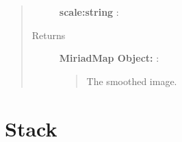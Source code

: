 \documentclass[a4paper,10pt,english]{sphinxmanual}
\begin{document}
\begin{fulllineitems}
\begin{fulllineitems}
\begin{quote}
\begin{description}
\textbf{scale:string} :

\item[{Returns }] \leavevmode
\textbf{MiriadMap Object:} :
\begin{quote}

The smoothed image.
\end{quote}

\end{description}\end{quote}

\end{fulllineitems}


\end{fulllineitems}



\section{Stack}
\label{maps:stack}
\end{document}
